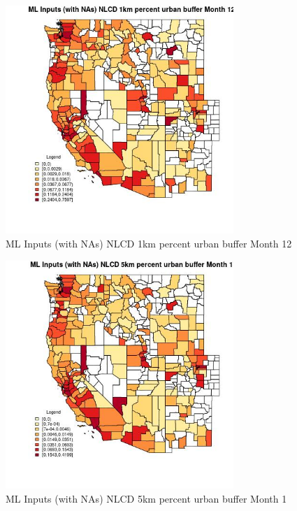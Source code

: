 \begin{figure} 
\centering  
\includegraphics[width=0.77\textwidth]{Code_Outputs/Report_ML_input_PM25_Step4_part_f_de_duplicated_aves_prioritize_24hr_obswNAs_CountyNLCD_1km_percent_urban_buffermedianMonth12.jpg} 
\caption{\label{fig:Report_ML_input_PM25_Step4_part_f_de_duplicated_aves_prioritize_24hr_obswNAsCountyNLCD_1km_percent_urban_buffermedianMonth12}ML Inputs (with NAs) NLCD 1km percent urban buffer Month 12} 
\end{figure} 
 

\begin{figure} 
\centering  
\includegraphics[width=0.77\textwidth]{Code_Outputs/Report_ML_input_PM25_Step4_part_f_de_duplicated_aves_prioritize_24hr_obswNAs_CountyNLCD_5km_percent_urban_buffermedianMonth1.jpg} 
\caption{\label{fig:Report_ML_input_PM25_Step4_part_f_de_duplicated_aves_prioritize_24hr_obswNAsCountyNLCD_5km_percent_urban_buffermedianMonth1}ML Inputs (with NAs) NLCD 5km percent urban buffer Month 1} 
\end{figure} 
 

